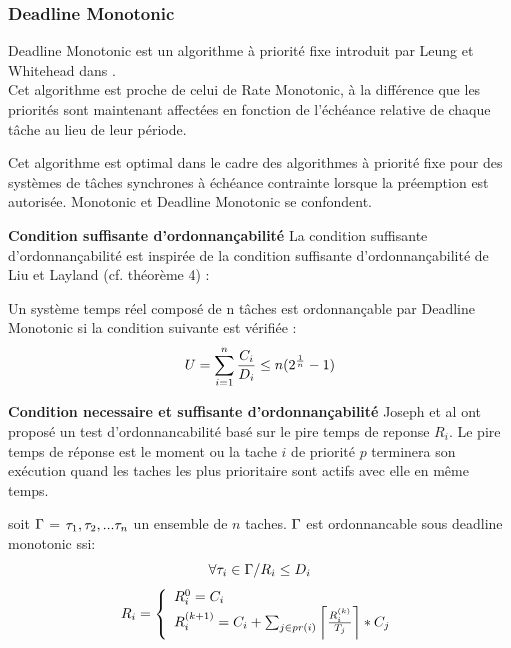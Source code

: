 \subsubsection{Deadline Monotonic \cite{LW82}}
\vspace{-1cm}
Deadline Monotonic est un algorithme à priorité fixe introduit par Leung et Whitehead dans \cite{LW82}.\\
Cet algorithme est proche de celui de Rate Monotonic, à la différence que les priorités sont maintenant affectées en fonction de l'échéance relative de chaque tâche au lieu de leur période.
\begin{theoreme}
Cet algorithme est optimal dans le cadre des algorithmes à priorité fixe pour des systèmes de tâches synchrones à échéance contrainte lorsque la préemption est autorisée. Monotonic et Deadline Monotonic se confondent.
\end{theoreme}

\textbf{Condition suffisante d'ordonnançabilité} La condition suffisante d'ordonnançabilité est inspirée de la condition suffisante d'ordonnançabilité de Liu et Layland (cf. théorème 4) :

\begin{theoreme}
 Un système temps réel composé de n tâches est ordonnançable par Deadline
Monotonic si la condition suivante est vérifiée :
\begin{equation}
U = \sum_{i=1}^n \frac{C_{i}}{D_{i}} \leq n ( 2^{\frac{1}{n}} - 1)
\end{equation}
\end{theoreme}

\textbf{Condition necessaire et suffisante d'ordonnançabilité} Joseph et al \cite{JP86} ont proposé un test d’ordonnancabilité basé sur le pire
temps de reponse $R_{i}$.  Le pire temps de réponse est le moment ou la tache $i$ de priorité $p$ terminera son exécution quand les taches les plus prioritaire sont actifs avec elle en même temps.\\

\begin{theoreme}
soit $\Gamma$ = $\tau_{1},\tau_{2},. . . \tau_{n}$ un ensemble de $n$
taches.  $\Gamma$ est ordonnancable sous deadline monotonic ssi:
\begin{equation}
\forall \tau_{i} \in \Gamma / R_{i} \leq D_{i}
\end{equation}
\begin{equation}
R_{i} = 
\left\lbrace
\begin{array}{l}
R_{i}^0=C_{i}
\\
 R_{i}^{(k+1)}=C_{i}+\sum_{j \in pr(i)}  \left \lceil 
 \frac{R_{i}^{(k)}}{T_{j}} \right \rceil * C_{j}  
\end{array}\right.
\end{equation}
\end{theoreme}

